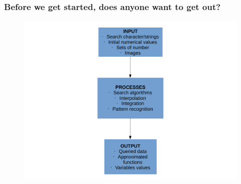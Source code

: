 \begin{frame}[fragile]
\frametitle{Before we get started, does anyone want to get out?}
\begin{figure}
\includegraphics[width=0.8\linewidth]{ProgrammingFlow.pdf}
\end{figure}
\end{frame}